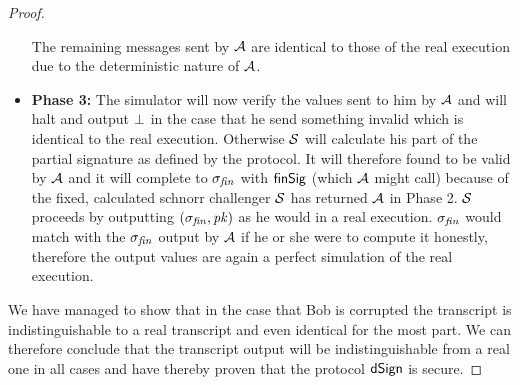 \begin{proof}
\begin{itemize}
        The remaining messages sent by $\mathcal{A}$ are identical to those of the real execution due to the deterministic nature of $\mathcal{A}$.
        \item \textbf{Phase 3: } The simulator will now verify the values sent to him by $\mathcal{A}$ and will halt and output $\bot$ in the case that he send something invalid which is identical to the real execution.
        Otherwise $\mathcal{S}$ will calculate his part of the partial signature as defined by the protocol.
        It will therefore found to be valid by $\mathcal{A}$ and it will complete to $\sigma_{\mathit{fin}}$ with $\mathsf{finSig}$ (which $\mathcal{A}$ might call) because of the fixed, calculated schnorr challenger $\mathcal{S}$ has returned $\mathcal{A}$ in Phase 2.
        $\mathcal{S}$ proceeds by outputting $(\sigma_{\mathit{fin}}, \mathit{pk})$ as he would in a real execution.
        $\sigma_{\mathit{fin}}$ would match with the $\sigma_{\mathit{fin}}$ output by $\mathcal{A}$ if he or she were to compute it honestly, therefore the output values are again a perfect simulation of the real execution.
    \end{itemize}

    We have managed to show that in the case that Bob is corrupted the transcript is indistinguishable to a real transcript and even identical for the most part.
    We can therefore conclude that the transcript output will be indistinguishable from a real one in all cases and have thereby proven that the protocol $\mathsf{dSign}$ is secure.
\end{proof}

